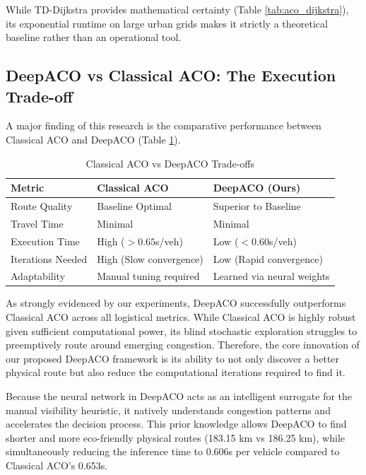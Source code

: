 \documentclass[conference]{IEEEtran}
\begin{document}
While TD-Dijkstra provides mathematical certainty (Table \ref{tab:aco_dijkstra}), its exponential runtime on large urban grids makes it strictly a theoretical baseline rather than an operational tool.

\subsection{DeepACO vs Classical ACO: The Execution Trade-off}

A major finding of this research is the comparative performance between Classical ACO and DeepACO (Table \ref{tab:aco_deepaco}).

\begin{table}[htbp]
\centering
\caption{Classical ACO vs DeepACO Trade-offs}
\label{tab:aco_deepaco}
\begin{tabular}{@{}lll@{}}
\toprule
\textbf{Metric} & \textbf{Classical ACO} & \textbf{DeepACO (Ours)} \\ \midrule
Route Quality & Baseline Optimal & Superior to Baseline \\
Travel Time & Minimal & Minimal \\
Execution Time & High ($>0.65$s/veh) & Low ($<0.60$s/veh) \\
Iterations Needed & High (Slow convergence) & Low (Rapid convergence) \\
Adaptability & Manual tuning required & Learned via neural weights \\ \bottomrule
\end{tabular}
\end{table}

As strongly evidenced by our experiments, DeepACO successfully outperforms Classical ACO across all logistical metrics. While Classical ACO is highly robust given sufficient computational power, its blind stochastic exploration struggles to preemptively route around emerging congestion. Therefore, the core innovation of our proposed DeepACO framework is its ability to not only discover a better physical route but also reduce the computational iterations required to find it. 

Because the neural network in DeepACO acts as an intelligent surrogate for the manual visibility heuristic, it natively understands congestion patterns and accelerates the decision process. This prior knowledge allows DeepACO to find shorter and more eco-friendly physical routes (183.15 km vs 186.25 km), while simultaneously reducing the inference time to 0.606s per vehicle compared to Classical ACO's 0.653s.
\end{document}
